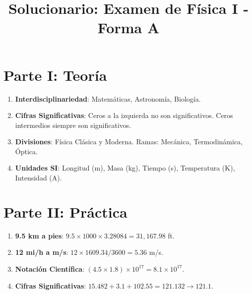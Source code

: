 \documentclass[a4paper,12pt]{article}
\title{Solucionario: Examen de Física I - Forma A}
\date{}
\begin{document}
\maketitle

\section{Parte I: Teoría}
\begin{enumerate}
    \item \textbf{Interdisciplinariedad}: Matemáticas, Astronomía, Biología.
    \item \textbf{Cifras Significativas}: Ceros a la izquierda no son significativos. Ceros intermedios siempre son significativos.
    \item \textbf{Divisiones}: Física Clásica y Moderna. Ramas: Mecánica, Termodinámica, Óptica.
    \item \textbf{Unidades SI}: Longitud (m), Masa (kg), Tiempo (s), Temperatura (K), Intensidad (A).
\end{enumerate}

\section{Parte II: Práctica}
\begin{enumerate}
    \item \textbf{9.5 km a pies}: $9.5 \times 1000 \times 3.28084 = 31,167.98$ ft.
    \item \textbf{12 mi/h a m/s}: $12 \times 1609.34 / 3600 = 5.36$ m/s.
    \item \textbf{Notación Científica}: $(4.5 \times 1.8) \times 10^{17} = 8.1 \times 10^{17}$.
    \item \textbf{Cifras Significativas}: $15.482 + 3.1 + 102.55 = 121.132 \rightarrow 121.1$.
\end{enumerate}
\end{document}
